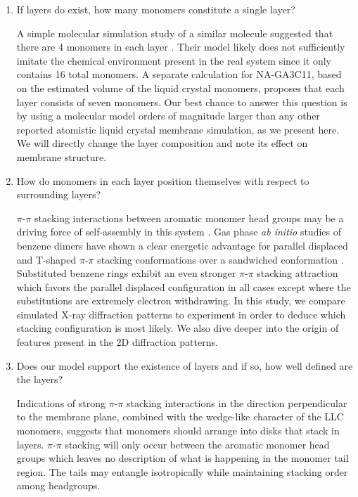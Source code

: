 \documentclass[journal=jpcbfk,manusciprt=article]{achemso}
\begin{document}
  \begin{enumerate}

  \item If layers do exist, how many monomers constitute a single layer? \label{point:monomernum}
  
  A simple molecular simulation study of a similar molecule suggested that
  there are 4 monomers in each layer \cite{zhu_methacrylated_2006}. Their model
  likely does not sufficiently imitate the chemical environment present in the
  real system since it only contains 16 total monomers. A separate calculation
  for NA-GA3C11, based on the estimated volume of the liquid crystal monomers,
  proposes that each layer consists of seven
  monomers\cite{resel_structural_2000}. Our best chance to answer this question
  is by using a molecular model orders of magnitude larger than any other
  reported atomistic liquid crystal membrane simulation, as we present here. We
  will directly change the layer composition and note its effect on membrane
  structure.

  \item How do monomers in each layer position themselves with respect to
  surrounding layers? \label{point:orientation}

  $\pi$-$\pi$ stacking interactions between aromatic monomer head groups may be
  a driving force of self-assembly in this system \cite{gazit_possible_2002}. Gas
  phase \textit{ab initio} studies of benzene dimers have shown a clear energetic
  advantage for parallel displaced and T-shaped $\pi$-$\pi$ stacking
  conformations over a sandwiched conformation \cite{sinnokrot_estimates_2002}.
  Substituted benzene rings exhibit an even stronger $\pi$-$\pi$ stacking
  attraction which favors the parallel displaced configuration in all cases
  except where the substitutions are extremely electron
  withdrawing\cite{waller_hybrid_2006,ringer_effect_2006}. In this study, we
  compare simulated X-ray diffraction patterns to experiment in order to deduce
  which stacking configuration is most likely. We also dive deeper into the
  origin of features present in the 2D diffraction patterns.  

  \item Does our model support the existence of layers and if so, how well
  defined are the layers? \label{point:layers} 

  Indications of strong $\pi$-$\pi$ stacking interactions in the direction
  perpendicular to the membrane plane, combined with the wedge-like character of
  the LLC monomers, suggests that monomers should arrange into disks that stack in
  layers. $\pi$-$\pi$ stacking will only occur between the aromatic
  monomer head groups which leaves no description of what is happening in the
  monomer tail region. The tails may entangle isotropically while maintaining
  stacking order among headgroups. 


\end{enumerate}
\end{document}
